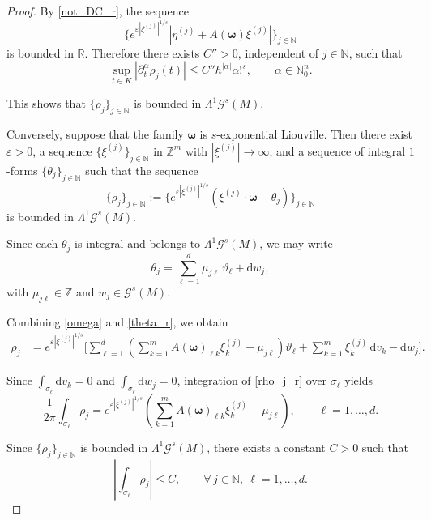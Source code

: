 \documentclass[11pt,reqno]{amsart}
\numberwithin{equation}{section}
\begin{document}
\begin{proof}
	By \eqref{not_DC_r}, the sequence
	\[
	\big\{ e^{\varepsilon|\xi^{(j)}|^{1/s}} |\eta^{(j)} + A(\boldsymbol{\omega})\xi^{(j)}|	\big\}_{j\in\mathbb{N}}
	\]
	is bounded in $\mathbb{R}$. Therefore there exists $C''>0$, independent of $j\in\mathbb{N}$, such that
	\[
	\sup_{t\in K} |\partial_t^\alpha \rho_j(t)| 
	\le C'' h^{|\alpha|}\alpha!^s, \qquad \alpha\in\mathbb{N}_0^n.
	\]
	
	This shows that $\{\rho_j\}_{j\in\mathbb{N}}$ is bounded in $\mathsf{\Lambda}^1\mathscr{G}^s(M)$.
	
	
	\medskip
	
	Conversely, suppose that the family $\boldsymbol{\omega}$ is $s$-exponential Liouville.  Then there exist $\varepsilon>0$, a sequence $\{\xi^{(j)}\}_{j\in\mathbb{N}} $ in $\mathbb{Z}^m$ with $|\xi^{(j)}|\to\infty$, and a sequence of integral $1$-forms $\{\theta_j\}_{j\in\mathbb{N}}$ such that the sequence
	\[
	\{\rho_j\}_{j\in\mathbb{N}} := \big\{e^{\varepsilon|\xi^{(j)}|^{1/s}} (\xi^{(j)} \cdot \boldsymbol{\omega} - \theta_j)\big\}_{j\in\mathbb{N}}
	\]
	is bounded in $\mathsf{\Lambda}^1 \mathscr{G}^s(M)$.
	
	Since each $\theta_j$ is integral and belongs to $\mathsf{\Lambda}^1\mathscr{G}^s(M)$, we may write
	\begin{equation}\label{theta_r}
		\theta_j = \sum_{\ell=1}^{d} \mu_{j\ell}\,\vartheta_\ell + \mathrm{d}w_j,
	\end{equation}
	with $\mu_{j\ell} \in \mathbb{Z}$ and $w_j \in \mathscr{G}^s(M)$.
	
	Combining \eqref{omega} and \eqref{theta_r}, we obtain
	\begin{align}
		\rho_j &= e^{\varepsilon|\xi^{(j)}|^{1/s}} \Bigg[ \sum_{\ell=1}^{d}
		\left(\sum_{k=1}^{m} A(\boldsymbol{\omega})_{\ell k}\xi^{(j)}_k
		- \mu_{j\ell} \right) \vartheta_\ell + \sum_{k=1}^{m}\xi^{(j)}_k\,\mathrm{d}v_k
		- \mathrm{d}w_j \Bigg]. \label{rho_j_r}
	\end{align}
	
	Since $\int_{\sigma_\ell} \mathrm{d}v_k = 0$ and $\int_{\sigma_\ell} \mathrm{d}w_j = 0$, 
	integration of \eqref{rho_j_r} over $\sigma_\ell$ yields
	\[
	\frac{1}{2\pi} \int_{\sigma_\ell} \rho_j = e^{\varepsilon|\xi^{(j)}|^{1/s}} \left( \sum_{k=1}^{m}
	A(\boldsymbol{\omega})_{\ell k}\xi^{(j)}_k - \mu_{j\ell} \right), \qquad \ell=1,\dots,d.
	\]

	Since $\{\rho_j\}_{j\in\mathbb{N}}$ is bounded in $\mathsf{\Lambda}^1 \mathscr{G}^s(M)$, there exists a constant $C>0$ such that
	\[
	\left| \int_{\sigma_\ell} \rho_j \right| \le C, \qquad \forall\, j\in\mathbb{N},\ \ell=1,\dots,d.
	\]
	

\end{proof}
\end{document}
